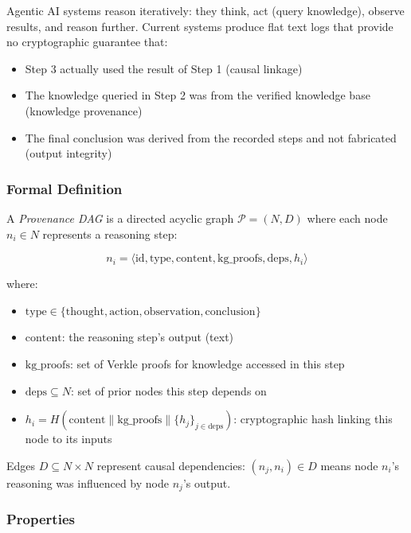 \documentclass[11pt,a4paper]{article}
\begin{document}
Agentic AI systems reason iteratively: they think, act (query knowledge), observe results, and reason further. Current systems produce flat text logs that provide no cryptographic guarantee that:
\begin{itemize}[noitemsep]
    \item Step 3 actually used the result of Step 1 (causal linkage)
    \item The knowledge queried in Step 2 was from the verified knowledge base (knowledge provenance)
    \item The final conclusion was derived from the recorded steps and not fabricated (output integrity)
\end{itemize}

\subsubsection{Formal Definition}

A \textit{Provenance DAG} is a directed acyclic graph $\mathcal{P} = (N, D)$ where each node $n_i \in N$ represents a reasoning step:

\begin{equation}
n_i = \langle \text{id}, \text{type}, \text{content}, \text{kg\_proofs}, \text{deps}, h_i \rangle
\label{eq:prov_node}
\end{equation}

where:
\begin{itemize}[noitemsep]
    \item $\text{type} \in \{\text{thought}, \text{action}, \text{observation}, \text{conclusion}\}$
    \item $\text{content}$: the reasoning step's output (text)
    \item $\text{kg\_proofs}$: set of Verkle proofs for knowledge accessed in this step
    \item $\text{deps} \subseteq N$: set of prior nodes this step depends on
    \item $h_i = H(\text{content} \| \text{kg\_proofs} \| \{h_j\}_{j \in \text{deps}})$: cryptographic hash linking this node to its inputs
\end{itemize}

Edges $D \subseteq N \times N$ represent causal dependencies: $(n_j, n_i) \in D$ means node $n_i$'s reasoning was influenced by node $n_j$'s output.

\subsubsection{Properties}
\end{document}
